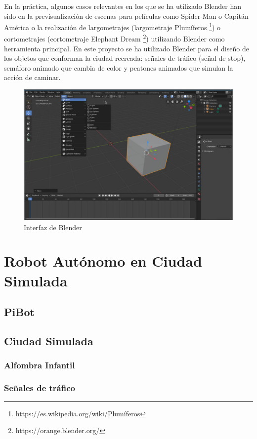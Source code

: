 \documentclass{report}
\begin{document}
En la práctica, algunos casos relevantes en los que se ha utilizado Blender han sido en la previsualización de escenas para películas como Spider-Man o Capitán América o la realización de largometrajes (largometraje Plumíferos \footnote{https://es.wikipedia.org/wiki/Plumíferos}) o cortometrajes (cortometraje Elephant Dream \footnote{https://orange.blender.org/}) utilizando Blender como herramienta principal. En este proyecto se ha utilizado Blender para el diseño de los objetos que conforman la ciudad recreada: señales de tráfico (señal de stop), semáforo animado que cambia de color y peatones animados que simulan la acción de caminar.

\renewcommand{\figurename}{Figura}		
\begin{figure}[h]
	\centering
	 \includegraphics[scale=1.5]{images/blender.jpg}
	 \caption{Interfaz de Blender}
\end{figure}

\chapter{Robot Autónomo en Ciudad Simulada}
\section{PiBot}
\section{Ciudad Simulada}
\subsection{Alfombra Infantil}
\subsection{Señales de tráfico}
\end{document}
